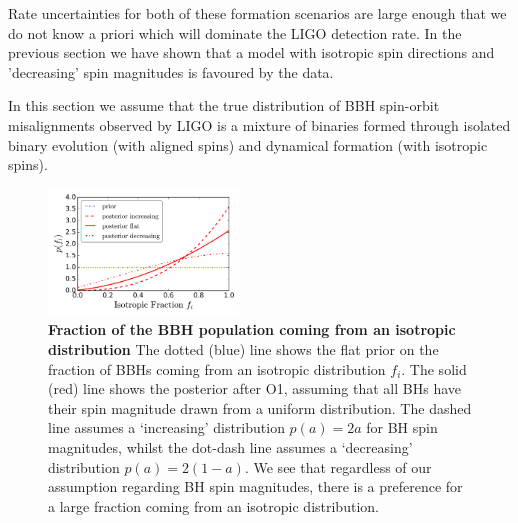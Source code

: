 \documentclass[modern,linenumbers]{aastex61}
\begin{document}
Rate uncertainties for both of these formation scenarios are large enough that we do not know a priori which will dominate the LIGO detection rate. In the previous section we have shown that a model with isotropic spin directions and 'decreasing' spin magnitudes is favoured by the data.

In this section we assume that the true distribution of BBH spin-orbit misalignments observed by LIGO is a mixture of binaries formed through isolated binary evolution (with aligned spins) and dynamical formation (with isotropic spins). 

%
\begin{figure}
\centering
\includegraphics[width=0.45\textwidth]{../plots/posterior_on_isotropic_fraction.png}
\caption{\textbf{Fraction of the BBH population coming from an isotropic distribution} The dotted (blue) line shows the flat prior on the fraction of BBHs coming from an isotropic distribution $f_i$. The solid (red) line shows the posterior after O1, assuming that all BHs have their spin magnitude drawn from a uniform distribution. The dashed line assumes a `increasing' distribution $p(a) = 2a$ for BH spin magnitudes, whilst the dot-dash line assumes a `decreasing' distribution $p(a) = 2(1-a)$. We see that regardless of our assumption regarding BH spin magnitudes, there is a preference for a large fraction coming from an isotropic distribution.}
\label{fig:mixture_fraction_posterior}
\end{figure}
%

%
\end{document}
